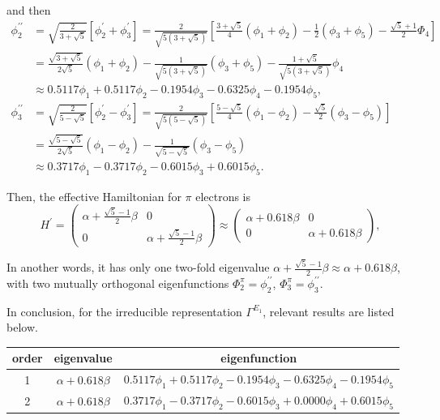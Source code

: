 		and then
		\begin{align*}
			\phi^{\prime\prime}_2 &= \sqrt{ \frac{2}{3+\sqrt{5}} } \left[ \phi^\prime_2 + \phi^\prime_3 \right] = \frac{2}{ \sqrt{5(3+\sqrt{5})} } \left[ \frac{3+\sqrt{5}}{4}(\phi_1 + \phi_2) - \frac{1}{2} (\phi_3 + \phi_5) - \frac{ \sqrt{5}+1 }{2} \Phi_4 \right]\\
			&= \frac{ \sqrt{3+\sqrt{5}} }{2\sqrt{5}}(\phi_1 + \phi_2) - \frac{1}{ \sqrt{ 5(3+\sqrt{5}) } } (\phi_3 + \phi_5) - \frac{ 1+\sqrt{5} }{ \sqrt{ 5(3+\sqrt{5}) } } \phi_4 \\
			&\approx 0.5117 \phi_1 + 0.5117 \phi_2 -0.1954 \phi_3 -0.6325\phi_4 -0.1954 \phi_5 , \\
			\phi^{\prime\prime}_3 &= \sqrt{ \frac{2}{5-\sqrt{5}} } \left[ \phi^\prime_2 - \phi^\prime_3 \right] = \frac{2}{ \sqrt{5(5-\sqrt{5})} }\left[ \frac{ 5-\sqrt{5} }{4} (\phi_1 - \phi_2) - \frac{ \sqrt{5} }{2} (\phi_3 - \phi_5) \right] \\
			&= \frac{ \sqrt{ 5-\sqrt{5} } }{ 2\sqrt{5} } (\phi_1 - \phi_2) - \frac{ 1 }{ \sqrt{ 5-\sqrt{5} } }(\phi_3 - \phi_5) \\
			&\approx 0.3717 \phi_1 - 0.3717 \phi_2 - 0.6015\phi_3 + 0.6015 \phi_5.
		\end{align*}
		
		Then, the effective Hamiltonian for $\pi$ electrons is
		\begin{equation*}
			H^\prime = \begin{pmatrix}
				\alpha + \frac{ \sqrt{5}-1 }{2}\beta & 0 \\
				0 & \alpha + \frac{ \sqrt{5}-1 }{2}\beta
			\end{pmatrix} \approx
			\begin{pmatrix}
				\alpha + 0.618 \beta & 0 \\ 0 & \alpha + 0.618 \beta
			\end{pmatrix}				,
		\end{equation*}
		
		In another words, it has only one two-fold eigenvalue $\alpha + \frac{ \sqrt{5}-1 }{2} \beta\approx \alpha + 0.618 \beta$, with two mutually orthogonal eigenfunctions $\Phi^\pi_2 = \phi^{\prime\prime}_2$, $\Phi^\pi_3 = \phi^{\prime\prime}_3$.
		
		In conclusion, for the irreducible representation $\Gamma^{E_1}$, relevant results are listed below.
		
		\begin{center}
		\setlength{\abovecaptionskip}{0em}
		\begin{tabular}{ccc}\hline
		  order	&	eigenvalue		& 	eigenfunction	\\ \hline
			1	&$\alpha+0.618\beta$& 	$0.5117\phi_1 + 0.5117 \phi_2 -0.1954 \phi_3 -0.6325 \phi_4 -0.1954 \phi_5$ \\
			2	&$\alpha+0.618\beta$& 	$0.3717\phi_1 - 0.3717 \phi_2 -0.6015 \phi_3 +0.0000 \phi_4 +0.6015 \phi_5$ \\
			 \hline
		\end{tabular}
		\end{center}
		
